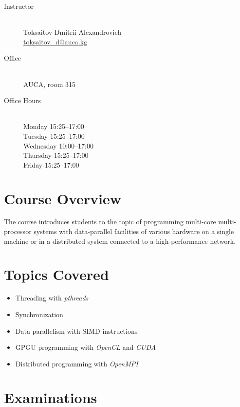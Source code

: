 \documentclass[12pt,a4paper,oneside]{article}
\begin{document}
        \begin{description}
            \item[Instructor]\hfill\\
                Toksaitov Dmitrii Alexandrovich\\
                \href{mailto:toksaitov_d@auca.kg}{toksaitov\_d@auca.kg}
            \item[Office]\hfill\\
                AUCA, room 315
            \item[Office Hours]\hfill\\
                Monday 15:25--17:00\\
                Tuesday 15:25--17:00\\
                Wednesday 10:00--17:00\\
                Thursday 15:25--17:00\\
                Friday 15:25--17:00
        \end{description}

    \section{Course Overview}

        The course introduces students to the topic of programming multi-core
        multi-processor systems with data-parallel facilities of various
        hardware on a single machine or in a distributed system connected to a
        high-performance network.

    \section{Topics Covered}

        \begin{itemize}
            \item Threading with \textit{pthreads}
            \item Synchronization
            \item Data-parallelism with SIMD instructions
            \item GPGU programming with \textit{OpenCL} and \textit{CUDA}
            \item Distributed programming with \textit{OpenMPI}
        \end{itemize}

    \section{Examinations}
\end{document}
